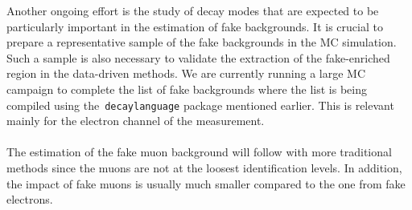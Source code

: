 Another ongoing effort is the study of decay modes that are expected to be particularly important in the estimation of fake backgrounds. %
It is crucial to prepare a representative sample of the fake backgrounds in the MC simulation. %
Such a sample is also necessary to validate the extraction of the fake-enriched region in the data-driven methods. %
We are currently running a large MC campaign to complete the list of fake backgrounds where the list is being compiled using the~{\texttt{decaylanguage}} package mentioned earlier. %
This is relevant mainly for the electron channel of the measurement. %
\\\\
The estimation of the fake muon background will follow with more traditional methods since the muons are not at the loosest identification levels. %
In addition, the impact of fake muons is usually much smaller compared to the one from fake electrons. %
\\\\

